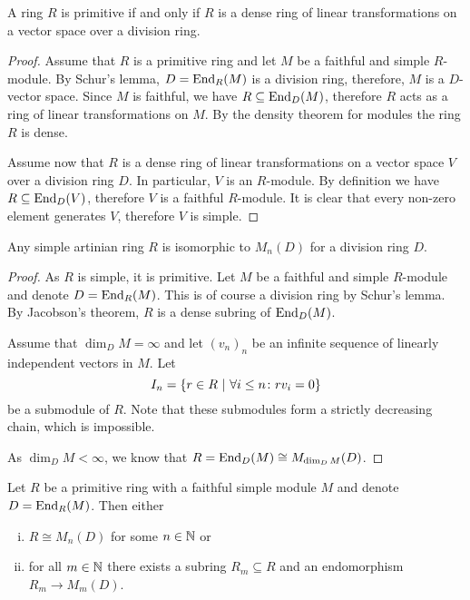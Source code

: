 \begin{izrek}[Jacobson]
A ring $R$ is primitive if and only if $R$ is a dense ring of
linear transformations on a vector space over a division ring.
\end{izrek}

\begin{proof}
Assume that $R$ is a primitive ring and let $M$ be a faithful and
simple $R$-module. By Schur's lemma, $D = \operatorname{End}_R(M)$ is a division
ring, therefore, $M$ is a $D$-vector space. Since $M$ is faithful,
we have $R \subseteq \operatorname{End}_D(M)$, therefore $R$ acts as a ring of
linear transformations on $M$. By the density theorem for modules
the ring $R$ is dense.

Assume now that $R$ is a dense ring of linear transformations on a
vector space $V$ over a division ring $D$. In particular, $V$ is
an $R$-module. By definition we have $R \subseteq \operatorname{End}_D(V)$,
therefore $V$ is a faithful $R$-module. It is clear that every
non-zero element generates $V$, therefore $V$ is simple.
\end{proof}

\begin{posledica}
Any simple artinian ring $R$ is isomorphic to $M_n(D)$ for a
division ring $D$.
\end{posledica}

\begin{proof}
As $R$ is simple, it is primitive. Let $M$ be a faithful and simple
$R$-module and denote $D = \operatorname{End}_R(M)$. This is of course a division
ring by Schur's lemma. By Jacobson's theorem, $R$ is a dense
subring of $\operatorname{End}_D(M)$.

Assume that $\dim_D M = \infty$ and let $(v_n)_n$ be an infinite
sequence of linearly independent vectors in $M$. Let
\[
I_n = \left\{r \in R~\middle\vert~\forall i \leq n \colon r v_i = 0\right\}
\]
be a submodule of $R$. Note that these submodules form a strictly
decreasing chain, which is impossible.

As $\dim_D M < \infty$, we know that
$R = \operatorname{End}_D(M) \cong M_{\dim_D M}(D)$.
\end{proof}

\begin{izrek}[Structure]
Let $R$ be a primitive ring with a faithful simple module $M$ and
denote $D = \operatorname{End}_R(M)$. Then either

\begin{enumerate}[i)]
\item $R \cong M_n(D)$ for some $n \in \mathbb{N}$ or
\item for all $m \in \mathbb{N}$ there exists a subring $R_m \subseteq R$
and an endomorphism $R_m \to M_m(D)$.
\end{enumerate}
\end{izrek}

